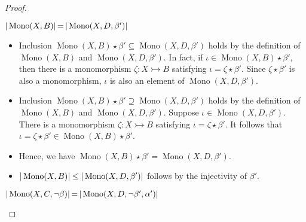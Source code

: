 \begin{proof}
    \label{subgraph_counting:proof:dcomp_w_u}
\begin{claim}
    $|\operatorname{Mono}(X, B)| \mathop{=} |\operatorname{Mono}(X, D, \beta')|$
\end{claim}
\begin{itemize} 
    \item Inclusion \(\operatorname{Mono}(X, B) \mathop{\star} \beta' \mathop{\subseteq} \operatorname{Mono}(X, D, \beta')\) holds by the definition of $\operatorname{Mono}(X, B)$ and $\operatorname{Mono}(X, D, \beta')$. 
    In fact, if \(\iota  \mathop{\in} \operatorname{Mono}(X, B) \mathop{\star} \beta' \), then there is a monomorphism \(\zeta : X \rightarrowtail B\) satisfying \(\iota \mathop{=} \zeta \mathop{\star} \beta'\). Since $\zeta \mathop{\star} \beta'$ is also a monomorphism, \(\iota\) is also an element of \(\operatorname{Mono}(X, D, \beta')\).
    \item Inclusion \(\operatorname{Mono}(X, B) \mathop{\star} \beta' \supseteq \operatorname{Mono}(X, D, \beta')\) holds by the definition of $\operatorname{Mono}(X, B)$ and $\operatorname{Mono}(X, D, \beta')$.
    Suppose \(\iota \mathop{\in} \operatorname{Mono}(X, D, \beta')\). There is a monomorphism \(\zeta : X \rightarrowtail B\) satisfying \(\iota \mathop{=} \zeta \mathop{\star} \beta'\). It follows that \(\iota \mathop{=} \zeta \mathop{\star} \beta' \mathop{\in} \operatorname{Mono}(X, B) \mathop{\star} \beta'\).
    \item Hence, we have \(\operatorname{Mono}(X, B) \mathop{\star} \beta' \mathop{=} \operatorname{Mono}(X, D, \beta')\).
    \item $|\operatorname{Mono}(X, B)| \leq |\operatorname{Mono}(X, D, \beta')|$ follows by the injectivity of $\beta'$.
\end{itemize}
\begin{claim}
     $|\operatorname{Mono}(X, C, \lnot \beta)| \mathop{=} |\operatorname{Mono}(X, D, \lnot \beta', \alpha')|$
   \end{claim}
    \begin{itemize}

\end{itemize}
\end{proof}
